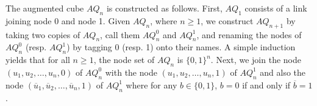 \question The augmented cube $AQ_n$ is constructed as follows. First, $AQ_1$ consists of a link joining node 0 and node 1. Given $AQ_n$, where $n \geq 1$, we construct $AQ_{n+1}$ by taking two copies of $AQ_n$, call them $AQ_n^0$ and $AQ^1_n$, and renaming the nodes of $AQ_n^0$ (resp. $AQ_n^1$) by tagging $0$ (resp. 1) onto their names. A simple induction yields that for all $n \geq 1$, the node set of $AQ_n$ is $\{0,1\}^n$. Next, we join the node $(u_1, u_2, \ldots, u_n, 0)$ of $AQ_n^0$ with the node $(u_1, u_2, \ldots, u_n, 1)$ of $AQ_n^1$ and also the node $(\overline u_1, \overline u_2, \ldots, \overline u_n, 1)$ of $AQ^1_n$ where for any $b \in \{0,1\}$, $b = 0$ if and only if $\overline b = 1$. 

